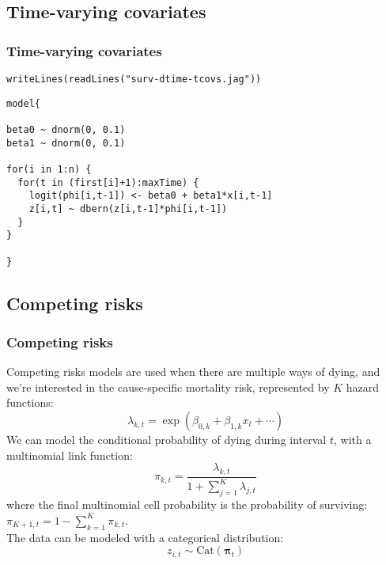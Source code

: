 \documentclass[color=usenames,dvipsnames]{beamer}\usepackage[]{graphicx}\usepackage[]{color}
\makeatletter
\newcommand{\hlstr}[1]{\textcolor[rgb]{0.749,0.012,0.012}{#1}}%
\newcommand{\hlstd}[1]{\textcolor[rgb]{0,0,0}{#1}}%
\newcommand{\hlkwd}[1]{\textcolor[rgb]{0.004,0.004,0.506}{#1}}%
\newenvironment{kframe}{%
 \def\at@end@of@kframe{}%
 \ifinner\ifhmode%
  \def\at@end@of@kframe{\end{minipage}}%
  \begin{minipage}{\columnwidth}%
 \fi\fi%
 \def\FrameCommand##1{\hskip\@totalleftmargin \hskip-\fboxsep
 \colorbox{shadecolor}{##1}\hskip-\fboxsep
     \hskip-\linewidth \hskip-\@totalleftmargin \hskip\columnwidth}%
 \MakeFramed {\advance\hsize-\width
   \@totalleftmargin\z@ \linewidth\hsize
   \@setminipage}}%
 {\par\unskip\endMakeFramed%
 \at@end@of@kframe}
\newenvironment{knitrout}{}{} %
\makeatother
\begin{document}
\subsection{Time-varying covariates}



\begin{frame}[fragile]
  \frametitle{Time-varying covariates}
\begin{knitrout}
\color{fgcolor}\begin{kframe}
\begin{alltt}
\hlkwd{writeLines}\hlstd{(}\hlkwd{readLines}\hlstd{(}\hlstr{"surv-dtime-tcovs.jag"}\hlstd{))}
\end{alltt}
\end{kframe}
\end{knitrout}
\begin{knitrout}
\color{fgcolor}\begin{kframe}
\begin{verbatim}
model{

beta0 ~ dnorm(0, 0.1)
beta1 ~ dnorm(0, 0.1)

for(i in 1:n) {
  for(t in (first[i]+1):maxTime) {
    logit(phi[i,t-1]) <- beta0 + beta1*x[i,t-1]
    z[i,t] ~ dbern(z[i,t-1]*phi[i,t-1])
  }
}

}
\end{verbatim}
\end{kframe}
\end{knitrout}
\end{frame}




\subsection{Competing risks}


\begin{frame}
  \frametitle{Competing risks}
  \small
  Competing risks models are used when there are multiple ways of
  dying, and we're interested in the cause-specific mortality risk,
  represented by $K$ hazard functions: 
  \[
    \lambda_{k,t} = \exp(\beta_{0,k} + \beta_{1,k}x_{t} + \cdots)
  \]
  \pause
  We can model the conditional probability of dying during interval
  $t$, with a multinomial link function:
  \[
    \pi_{k,t} = \frac{\lambda_{k,t}}{1+\sum_{j=1}^K \lambda_{j,t}}
  \]
  where the final multinomial cell probability is the probability of
  surviving: $\pi_{K+1,t} = 1-\sum_{k=1}^K \pi_{k,t}$. \\
  \pause
  \vfill
  The data can be modeled with a categorical distribution:
  \[
    z_{i,t} \sim \mathrm{Cat}({\bm \pi}_t)
  \]
\end{frame}
\end{document}
